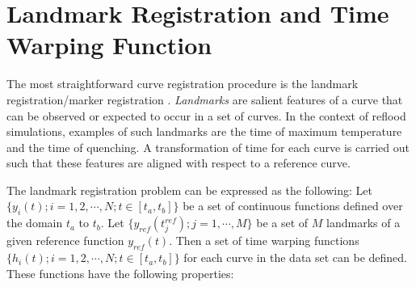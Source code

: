 \section{Landmark Registration and Time Warping Function}\label{app:landmark_registration}

The most straightforward curve registration procedure is the landmark registration/marker registration \cite{Ramsay2009}.
\emph{Landmarks} are salient features of a curve that can be observed or expected to occur in a set of curves.
In the context of reflood simulations, examples of such landmarks are the time of maximum temperature and the time of quenching.
A transformation of time for each curve is carried out such that these features are aligned with respect to a reference curve.

The landmark registration problem can be expressed as the following: 
Let $\{y_i(t); i = 1, 2, \cdots, N; t \in [t_a,t_b]\}$ be a set of continuous functions defined over the domain $t_a$ to $t_b$.
Let $\{y_{ref}(t^{ref}_j); j = 1, \cdots, M\}$ be a set of $M$ landmarks of a given reference function $y_{ref}(t)$.
Then a set of time warping functions $\{h_i(t); i = 1, 2, \cdots, N; t \in [t_a, t_b]\}$ for each curve in the data set can be defined.
These functions have the following properties:

